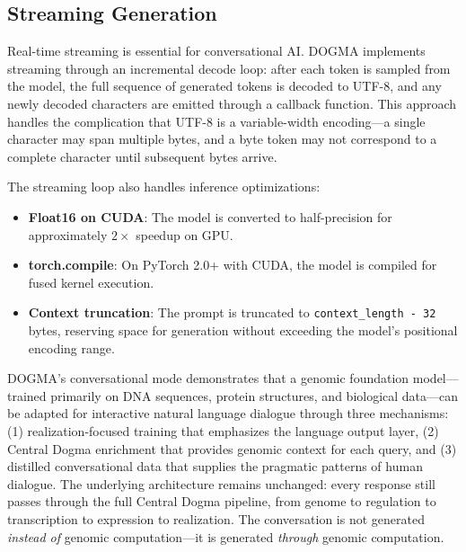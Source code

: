 \subsection{Streaming Generation}
\label{sec:streaming-gen}

Real-time streaming is essential for conversational AI. DOGMA implements streaming through an incremental decode loop: after each token is sampled from the model, the full sequence of generated tokens is decoded to UTF-8, and any newly decoded characters are emitted through a callback function. This approach handles the complication that UTF-8 is a variable-width encoding---a single character may span multiple bytes, and a byte token may not correspond to a complete character until subsequent bytes arrive.

The streaming loop also handles inference optimizations:
\begin{itemize}[leftmargin=1.5em]
  \item \textbf{Float16 on CUDA}: The model is converted to half-precision for approximately $2\times$ speedup on GPU.
  \item \textbf{torch.compile}: On PyTorch 2.0+ with CUDA, the model is compiled for fused kernel execution.
  \item \textbf{Context truncation}: The prompt is truncated to \texttt{context\_length - 32} bytes, reserving space for generation without exceeding the model's positional encoding range.
\end{itemize}

\begin{keytakeaway}
DOGMA's conversational mode demonstrates that a genomic foundation model---trained primarily on DNA sequences, protein structures, and biological data---can be adapted for interactive natural language dialogue through three mechanisms: (1) realization-focused training that emphasizes the language output layer, (2) Central Dogma enrichment that provides genomic context for each query, and (3) distilled conversational data that supplies the pragmatic patterns of human dialogue. The underlying architecture remains unchanged: every response still passes through the full Central Dogma pipeline, from genome to regulation to transcription to expression to realization. The conversation is not generated \emph{instead of} genomic computation---it is generated \emph{through} genomic computation.
\end{keytakeaway}

